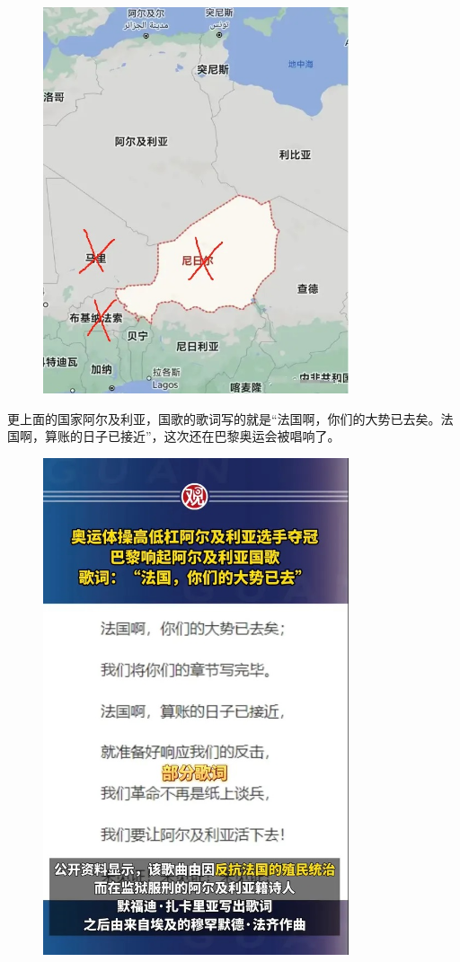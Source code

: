 \documentclass[UTF8, 11pt, oneside]{ctexart}
\begin{document}
\begin{figure}[H]
    \centering
    \includegraphics[width=9cm]{2024-08-08-004.jpg}
\end{figure}

更上面的国家阿尔及利亚，国歌的歌词写的就是“法国啊，你们的大势已去矣。法国啊，算账的日子已接近”，这次还在巴黎奥运会被唱响了。

\begin{figure}[H]
    \centering
    \includegraphics[width=9cm]{2024-08-08-005.jpg}
\end{figure}
\end{document}
